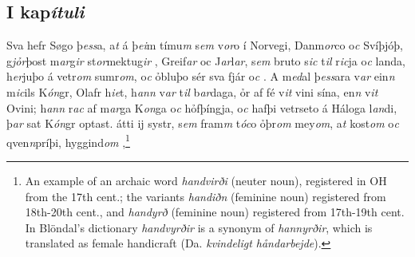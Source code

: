\subsection*{I kap\textit{ítuli}}
 Sva hefr Søgo þ\textit{ess}a, a\textit{t} á þ\textit{ei}m tímu\textit{m} s\textit{em}  v\textit{or}o í Norvegi, Dan\-m\textit{or}co o\textit{c} Svíþjóþ, g\textit{jỏr}þost m\textit{ar}g\textit{ir}    st\textit{or}\-mektug\textit{ir}  , Greif\textit{ar} oc J\textit{ar}l\textit{ar}, s\textit{em}  bruto   s\textit{ic}
t\textit{il} r\textit{ic}ja o\textit{c} landa,   h\textit{er}juþo    á vetr\textit{om}  sumr\textit{om}, 
o\textit{c} ỏbluþo sér sva fjár o\textit{c} .  
A m\textit{ed}al þ\textit{ess}ara   v\textit{ar} ein\textit{n} m\textit{ic}ils   K\textit{ón}gr,   Olafr h\textit{ie}t, h\textit{ann} v\textit{ar}  t\textit{il} b\textit{ar}daga,  
ỏr af fé v\textit{it} vini sína, en\textit{n}  
v\textit{it} Ovini; 
h\textit{ann}  r\textit{ac} af   m\textit{ar}ga K\textit{on}ga o\textit{c} hỏfþíngja, o\textit{c} hafþi  vetrseto   á Háloga l\textit{an}di, þ\textit{ar} sat K\textit{ón}gr optast.  
 átti ij systr, s\textit{em} fram\textit{m} t\textit{óc}o   ỏþr\textit{om} mey\textit{om}, a\textit{t} kost\textit{om}
o\textit{c}  qven\textit{n}príþi,   hyggind\textit{om}   ,\footnote{
	An example of an archaic word \textit{handvirði} (neuter noun), registered in OH from the 17th cent.; the variants \textit{handiðn} (feminine noun) registered from 18th-20th cent., and \textit{handyrð} (feminine noun) registered from 17th-19th cent. In Blöndal's dictionary \textit{handvyrðir} is a synonym of \textit{hannyrðir}, which is translated as female handicraft (Da. \textit{kvindeligt håndarbejde}).} 

